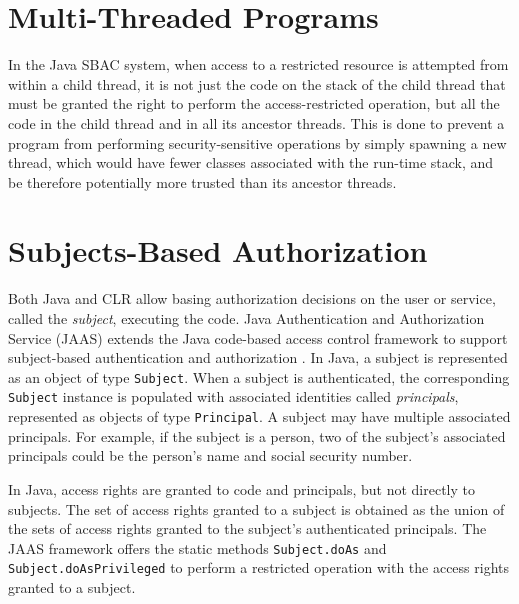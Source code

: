 \section{Multi-Threaded Programs} \label{sec:multi-threadedprograms}
In the Java SBAC system, when
access to a restricted resource is attempted from within a child
thread, it is not just the code on the stack of the child thread
that must be granted the right to perform the access-restricted
operation, but all the code in the child thread and in all its
ancestor threads. This is done to prevent a program from
performing security-sensitive operations by simply spawning a new
thread, which would have fewer classes associated with the
run-time stack, and be therefore potentially more trusted than its
ancestor threads.

\section{Subjects-Based Authorization} \label{sec:SubjectBasedAuthorization}
Both Java and CLR allow basing authorization decisions on the user
or service, called the \emph{subject}, executing the code.  Java
Authentication and Authorization Service (JAAS) extends the Java
code-based access control framework to support subject-based
authentication and authorization
\cite{book:J2EESecBook,paper:jaas}.  In Java, a subject is
represented as an object of type \texttt{Subject}. When a subject
is authenticated, the corresponding \texttt{Subject} instance is
populated with associated identities called \emph{principals},
represented as objects of type \texttt{Principal}. A subject may
have multiple associated principals.  For example, if the subject
is a person, two of the subject's associated principals could be
the person's name and social security number.

In Java, access rights are granted to code and principals, but
not directly to subjects. The set of access rights granted to a
subject is obtained as the union of the sets of access rights
granted to the subject's authenticated principals. The JAAS
framework offers the static methods \texttt{Subject.doAs} and
\texttt{Subject.doAsPrivileged} to perform a restricted operation
with the access rights granted to a subject.

